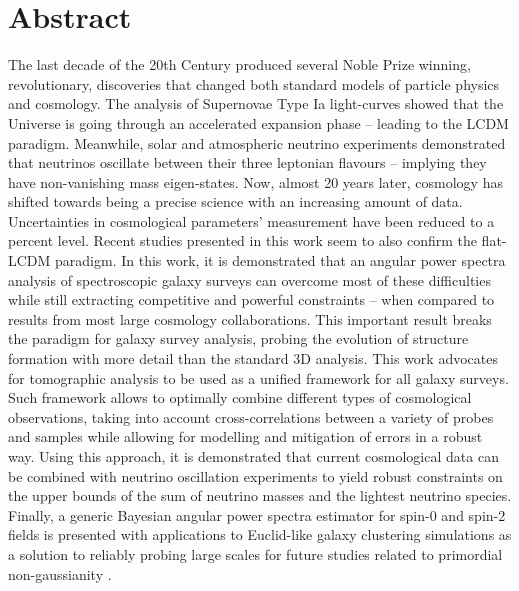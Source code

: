 %
\chapter*{Abstract}
\label{sec:abstract}
\vspace*{-10mm}

The last decade of the 20th Century produced several Noble Prize winning, revolutionary, discoveries that changed both standard models of particle physics and cosmology. The analysis of Supernovae Type Ia light-curves showed that the Universe is going through an accelerated expansion phase -- leading to the LCDM paradigm. Meanwhile, solar and atmospheric neutrino experiments demonstrated that neutrinos oscillate between their three leptonian flavours -- implying they have non-vanishing mass eigen-states. Now, almost 20 years later, cosmology has shifted towards being a precise science with an increasing amount of data. Uncertainties in cosmological parameters' measurement have been reduced to a percent level. Recent studies presented in this work seem to also confirm the flat-LCDM paradigm. In this work, it is demonstrated that an angular power spectra analysis of spectroscopic galaxy surveys can overcome most of these difficulties while still extracting competitive and powerful constraints -- when compared to results from most large cosmology collaborations. This important result breaks the paradigm for galaxy survey analysis, probing the evolution of structure formation with more detail than the standard 3D analysis. This work advocates for tomographic analysis to be used as a unified framework for all galaxy surveys. Such framework allows to optimally combine different types of cosmological observations, taking into account cross-correlations between a variety of probes and samples while allowing for modelling and mitigation of errors in a robust way. Using this approach, it is demonstrated that current cosmological data can be combined with neutrino oscillation experiments to yield robust constraints on the upper bounds of the sum of neutrino masses and the lightest neutrino species. Finally, a generic Bayesian angular power spectra estimator for spin-0 and spin-2 fields is presented with applications to Euclid-like galaxy clustering simulations as a solution to reliably probing large scales for future studies related to primordial non-gaussianity .